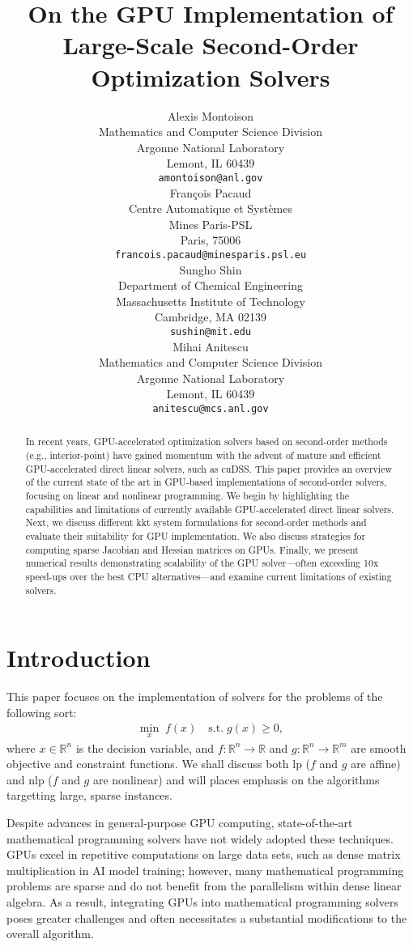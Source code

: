 \documentclass{article}
\title{On the GPU Implementation of Large-Scale Second-Order Optimization Solvers}
\author{%
  Alexis Montoison\\
  Mathematics and Computer Science Division\\
  Argonne National Laboratory\\
  Lemont, IL 60439\\
  \texttt{amontoison@anl.gov}\\
  \And
  Fran\c{c}ois Pacaud\\
  Centre Automatique et Systèmes\\
  Mines Paris-PSL\\
  Paris, 75006 \\
  \texttt{francois.pacaud@minesparis.psl.eu}\\
  \And
  Sungho Shin\\
  Department of Chemical Engineering\\
  Massachusetts Institute of Technology\\
  Cambridge, MA 02139\\
  \texttt{sushin@mit.edu}\\
  \And
  Mihai Anitescu\\
  Mathematics and Computer Science Division\\
  Argonne National Laboratory\\
  Lemont, IL 60439\\
  \texttt{anitescu@mcs.anl.gov}\\
}
\begin{document}
\maketitle


\begin{abstract}
In recent years, GPU-accelerated optimization solvers based on second-order methods (e.g., interior-point) have gained momentum with the advent of mature and efficient GPU-accelerated direct linear solvers, such as cuDSS. This paper provides an overview of the current state of the art in GPU-based implementations of second-order solvers, focusing on linear and nonlinear programming. We begin by highlighting the capabilities and limitations of currently available GPU-accelerated direct linear solvers. Next, we discuss different \gls*{kkt} system formulations for second-order methods and evaluate their suitability for GPU implementation. We also discuss strategies for computing sparse Jacobian and Hessian matrices on GPUs. Finally, we present numerical results demonstrating scalability of the GPU solver—often exceeding 10x speed-ups over the best CPU alternatives—and examine current limitations of existing solvers. 
\end{abstract}


\section{Introduction}\label{eqn:intro}

This paper focuses on the implementation of solvers for the problems of the following sort:
\begin{align}\label{eqn:opt}
  \min_{x } \; f(x) \quad \text{s.t.} \; g(x) \geq 0,
\end{align}
where \(x \in \mathbb{R}^n\) is the decision variable, and \(f: \mathbb{R}^n \to \mathbb{R}\) and \(g: \mathbb{R}^n \to \mathbb{R}^m\) are smooth objective and constraint functions.
We shall discuss both \gls*{lp} ($f$ and $g$ are affine) and \gls*{nlp} ($f$ and $g$ are nonlinear) and will places emphasis on the algorithms targetting large, sparse instances.


Despite advances in general-purpose GPU computing, state-of-the-art mathematical programming solvers have not widely adopted these techniques. GPUs excel in repetitive computations on large data sets, such as dense matrix multiplication in AI model training; however, many mathematical programming problems are sparse and do not benefit from the parallelism within dense linear algebra. As a result, integrating GPUs into mathematical programming solvers poses greater challenges and often necessitates a substantial modifications to the overall algorithm.
\end{document}
